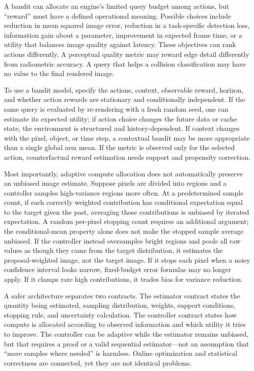 A bandit can allocate an engine's limited query budget among actions, but ``reward'' must have a defined operational meaning. Possible choices include reduction in mean squared image error, reduction in a task-specific detection loss, information gain about a parameter, improvement in expected frame time, or a utility that balances image quality against latency. These objectives can rank actions differently. A perceptual quality metric may reward edge detail differently from radiometric accuracy. A query that helps a collision classification may have no value to the final rendered image.

To use a bandit model, specify the actions, context, observable reward, horizon, and whether action rewards are stationary and conditionally independent. If the same query is evaluated by re-rendering with a fresh random seed, one can estimate its expected utility; if action choice changes the future data or cache state, the environment is structured and history-dependent. If context changes with the pixel, object, or time step, a contextual bandit may be more appropriate than a single global arm mean. If the metric is observed only for the selected action, counterfactual reward estimation needs support and propensity correction.

Most importantly, adaptive compute allocation does not automatically preserve an unbiased image estimate. Suppose pixels are divided into regions and a controller samples high-variance regions more often. At a predetermined sample count, if each correctly weighted contribution has conditional expectation equal to the target given the past, averaging those contributions is unbiased by iterated expectation. A random per-pixel stopping count requires an additional argument; the conditional-mean property alone does not make the stopped sample average unbiased. If the controller instead oversamples bright regions and pools all raw values as though they came from the target distribution, it estimates the proposal-weighted image, not the target image. If it stops each pixel when a noisy confidence interval looks narrow, fixed-budget error formulas may no longer apply. If it clamps rare high contributions, it trades bias for variance reduction.

A safer architecture separates two contracts. The estimator contract states the quantity being estimated, sampling distribution, weights, support conditions, stopping rule, and uncertainty calculation. The controller contract states how compute is allocated according to observed information and which utility it tries to improve. The controller can be adaptive while the estimator remains unbiased, but that requires a proof or a valid sequential estimator---not an assumption that ``more samples where needed'' is harmless. Online optimization and statistical correctness are connected, yet they are not identical problems.

